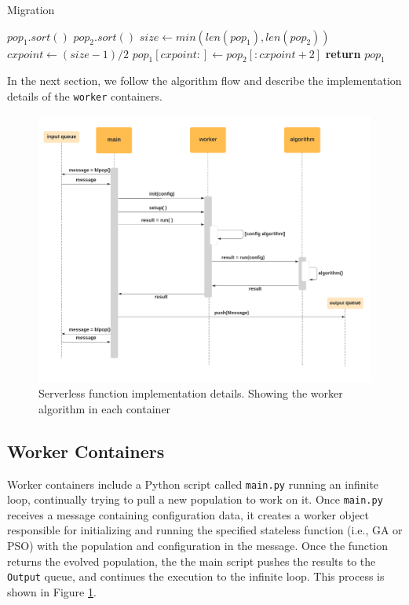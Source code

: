 \documentclass[review]{elsarticle}
\begin{document}
\begin{algorithm}
    \caption{Migration}
    \label{alg:migration}
    \begin{algorithmic}[1]
            \State $pop_1.sort()$
            \State $pop_2.sort()$
            \State $size\gets min(len(pop_1), len(pop_2))$
            \State $cxpoint\gets (size-1)/2$
            \State $pop_1[cxpoint:]\gets pop_2[:cxpoint+2]$
            \State \textbf{return} $pop_1$
        \EndProcedure 
    \end{algorithmic}
\end{algorithm}



In the next section, we follow the algorithm flow and describe the 
implementation details of the \texttt{worker} containers. 

\begin{figure}[ht]
    \centering
    \includegraphics[width=\textwidth]{worker_new}
    \caption{Serverless function implementation details. Showing the worker algorithm in each container}
    \label{fig:worker}
\end{figure}



\subsection{Worker Containers} 
\label{workers}

Worker containers include a Python script called \texttt{main.py} running an
infinite loop, continually trying to pull a new population to work on it. Once
\texttt{main.py} receives a message containing configuration data, it creates a
worker object responsible for initializing and running the specified stateless
function (i.e., GA or PSO) with the population and configuration in the message.
Once the function returns the evolved population, the
the main script pushes the results to the \texttt{Output} queue, and continues
the execution to the infinite loop. This process is shown in Figure
\ref{fig:worker}.
\end{document}
